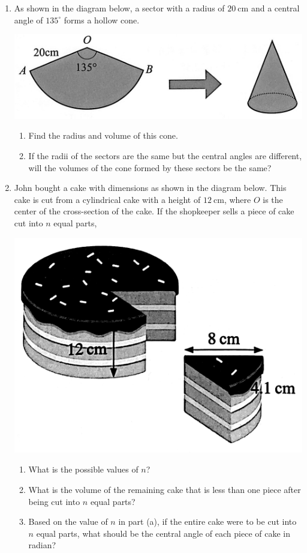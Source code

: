 \documentclass{report}
\begin{document}
\begin{enumerate}
	\newpage
	\item As shown in the diagram below, a sector with a radius of $20 \mathrm{~cm}$ and a central angle of $135^\circ$ forms a hollow cone.
	      \begin{center}
	      	\includegraphics[scale=0.12]{assets/8-34.png}
	      \end{center}
	      \begin{enumerate}
	      	\item Find the radius and volume of this cone.
	      	\item If the radii of the sectors are the same but the central angles are different, will the volumes of the cone formed by these sectors be the same?
	      \end{enumerate}
	          
	      
	\item John bought a cake with dimensions as shown in the diagram below. This cake is cut from a cylindrical cake with a height of $12 \mathrm{~cm}$, where $O$ is the center of the cross-section of the cake. If the shopkeeper sells a piece of cake cut into $n$ equal parts,
	      \begin{center}
	      	\includegraphics[scale=0.12]{assets/8-35.png}
	      \end{center}
	      \begin{enumerate}
	      	\item What is the possible values of $n$?
	      	\item What is the volume of the remaining cake that is less than one piece after being cut into $n$ equal parts?
	      	\item Based on the value of $n$ in part (a), if the entire cake were to be cut into $n$ equal parts, what should be the central angle of each piece of cake in radian?
	      \end{enumerate}
	      

\end{enumerate}
\end{document}
